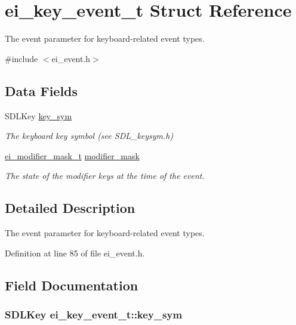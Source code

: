 \hypertarget{structei__key__event__t}{\section{ei\-\_\-key\-\_\-event\-\_\-t Struct Reference}
\label{structei__key__event__t}
}


The event parameter for keyboard-\/related event types.  




{\ttfamily \#include $<$ei\-\_\-event.\-h$>$}

\subsection*{Data Fields}
\begin{DoxyCompactItemize}
\item 
S\-D\-L\-Key \hyperlink{structei__key__event__t_a34be444e0f81bfa20e0b053779faf873}{key\-\_\-sym}
\begin{DoxyCompactList}\small\item\em The keyboard key symbol (see S\-D\-L\-\_\-keysym.\-h) \end{DoxyCompactList}\item 
\hyperlink{ei__event_8h_abcdd2ef0f39179463f17a06be9bdf949}{ei\-\_\-modifier\-\_\-mask\-\_\-t} \hyperlink{structei__key__event__t_a35e4dc6d788b9fdd4eeedf716662afab}{modifier\-\_\-mask}
\begin{DoxyCompactList}\small\item\em The state of the modifier keys at the time of the event. \end{DoxyCompactList}\end{DoxyCompactItemize}


\subsection{Detailed Description}
The event parameter for keyboard-\/related event types. 

Definition at line 85 of file ei\-\_\-event.\-h.



\subsection{Field Documentation}
\hypertarget{structei__key__event__t_a34be444e0f81bfa20e0b053779faf873}{
\subsubsection[{key\-\_\-sym}]{\setlength{\rightskip}{0pt plus 5cm}S\-D\-L\-Key ei\-\_\-key\-\_\-event\-\_\-t\-::key\-\_\-sym}}\label{structei__key__event__t_a34be444e0f81bfa20e0b053779faf873}


